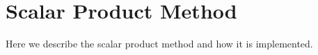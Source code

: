 \section{Scalar Product Method}
\label{SP}
Here we describe the scalar product method and how it is implemented.
